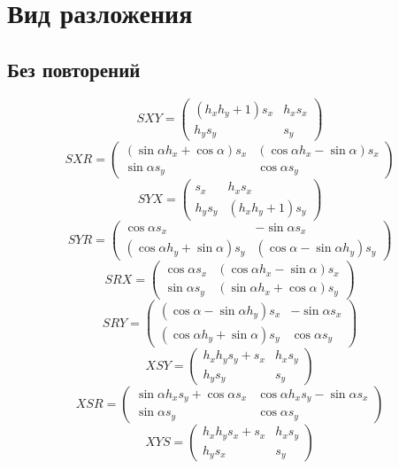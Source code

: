 \section{Вид разложения}
\subsection{Без повторений}
\[SXY = \begin{pmatrix}\left( {h_x} {h_y}+1\right)  {s_x} & {h_x} {s_x}\\
{h_y} {s_y} & {s_y}\end{pmatrix}\]
\[SXR = \begin{pmatrix}\left( \sin\alpha {h_x}+\cos\alpha\right)  {s_x} & \left( \cos\alpha {h_x}-\sin\alpha\right)  {s_x}\\
\sin\alpha {s_y} & \cos\alpha {s_y}\end{pmatrix}\]
\[SYX = \begin{pmatrix}{s_x} & {h_x} {s_x}\\
{h_y} {s_y} & \left( {h_x} {h_y}+1\right)  {s_y}\end{pmatrix}\]
\[SYR = \begin{pmatrix}\cos\alpha {s_x} & -\sin\alpha {s_x}\\
\left( \cos\alpha {h_y}+\sin\alpha\right)  {s_y} & \left( \cos\alpha-\sin\alpha {h_y}\right)  {s_y}\end{pmatrix}\]
\[SRX = \begin{pmatrix}\cos\alpha {s_x} & \left( \cos\alpha {h_x}-\sin\alpha\right)  {s_x}\\
\sin\alpha {s_y} & \left( \sin\alpha {h_x}+\cos\alpha\right)  {s_y}\end{pmatrix}\]
\[SRY = \begin{pmatrix}\left( \cos\alpha-\sin\alpha {h_y}\right)  {s_x} & -\sin\alpha {s_x}\\
\left( \cos\alpha {h_y}+\sin\alpha\right)  {s_y} & \cos\alpha {s_y}\end{pmatrix}\]
\[XSY = \begin{pmatrix}{h_x} {h_y} {s_y}+{s_x} & {h_x} {s_y}\\
{h_y} {s_y} & {s_y}\end{pmatrix}\]
\[XSR = \begin{pmatrix}\sin\alpha {h_x} {s_y}+\cos\alpha {s_x} & \cos\alpha {h_x} {s_y}-\sin\alpha {s_x}\\
\sin\alpha {s_y} & \cos\alpha {s_y}\end{pmatrix}\]
\[XYS = \begin{pmatrix}{h_x} {h_y} {s_x}+{s_x} & {h_x} {s_y}\\
{h_y} {s_x} & {s_y}\end{pmatrix}\]
